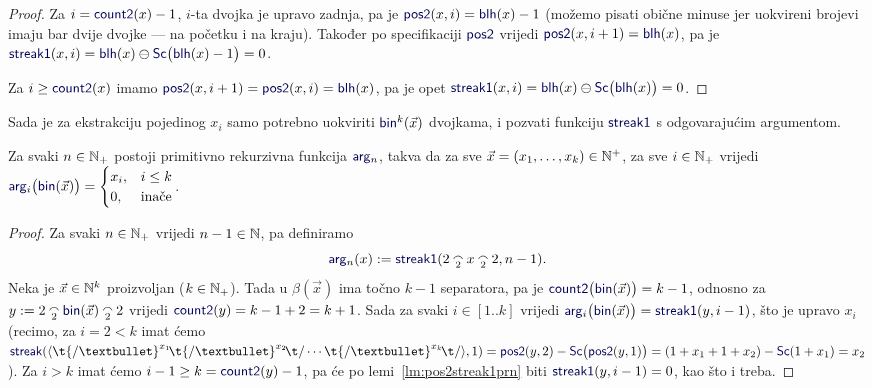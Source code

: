 \begin{proof}
Za $i=\f{count2}(x)-1$, $i$-ta dvojka je upravo zadnja, pa je $\f{pos2}(x,i)=\f{blh}(x)-1$ (možemo pisati obične minuse jer uokvireni brojevi imaju bar dvije dvojke --- na početku i na kraju). Također po specifikaciji $\f{pos2}$ vrijedi $\f{pos2}(x,i+1)=\f{blh}(x)$, pa je $\f{streak1}(x,i)=\f{blh}(x)\ominus\f{Sc}\bigl(\f{blh}(x)-1\bigr)=0$.

Za $i\ge\f{count2}(x)$ imamo $\f{pos2}(x,i+1)=\f{pos2}(x,i)=\f{blh}(x)$, pa je opet $\f{streak1}(x,i)=\f{blh}(x)\ominus\f{Sc}\bigl(\f{blh}(x)\bigr)=0$.
\end{proof}


Sada je za ekstrakciju pojedinog $x_i$ samo potrebno uokviriti $\f{bin}^k(\vec x)$ dvojkama, i pozvati funkciju $\f{streak1}$ s odgovarajućim argumentom.

\begin{propozicija}\label{pp:argnprn}
Za svaki $n\in{\mathbb N}_+$ postoji primitivno rekurzivna funkcija $\f{arg}_n$, takva da za sve $\vec x=(x_1,\dotsc,x_k)\in{\mathbb N}^+$, za sve $i\in{\mathbb N}_+$ vrijedi $\f{arg}_i\bigl(\f{bin}(\vec x)\bigr)=\begin{cases}
x_i,&i\le k\\
0,&\text{inače}
\end{cases}$.
\end{propozicija}

\begin{proof}
Za svaki $n\in{\mathbb N}_+$ vrijedi $n-1\in{\mathbb N}$, pa definiramo
\begin{equation}
    \f{arg}_n(x):=\f{streak1}(2\conc2x\conc22,n-1)\text.
\end{equation}
Neka je $\vec x\in{\mathbb N}^k$ proizvoljan ($k\in{\mathbb N}_+$). Tada u $\beta(\vec x)$ ima točno $k-1$ separatora, pa je $\f{count2}\bigl(\f{bin}(\vec x)\bigr)=k-1$, odnosno za $y:=2\conc2\f{bin}(\vec x)\conc22$ vrijedi $\f{count2}(y)=k-1+2=k+1$. Sada za svaki $i\in[1..k]$ vrijedi $\f{arg}_i\bigl(\f{bin}(\vec x)\bigr)=\f{streak1}(y,i-1)$, što je upravo $x_i$ (recimo, za $i=2<k$ imat ćemo $\f{streak}(\kr{\t{/\textbullet}^{x_1}\!\t{/\textbullet}^{x_2}\!\t/\dotsm\t{/\textbullet}^{x_k}\!\t/},1)=\f{pos2}(y,2)-\f{Sc}\bigl(\f{pos2}(y,1)\bigr)=(1+x_1+1+x_2)-\f{Sc}(1+x_1)=x_2$).
Za $i>k$ imat ćemo $i-1\ge k=\f{count2}(y)-1$, pa će po lemi~\ref{lm:pos2streak1prn} biti $\f{streak1}(y,i-1)=0$, kao što i treba.
\end{proof}

